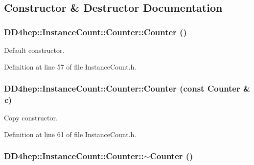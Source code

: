 \subsection{Constructor \& Destructor Documentation}
\hypertarget{class_d_d4hep_1_1_instance_count_1_1_counter_a80741252e730cdf0cb149b77578168a0}{
\subsubsection[{Counter}]{\setlength{\rightskip}{0pt plus 5cm}DD4hep::InstanceCount::Counter::Counter ()}}
\label{class_d_d4hep_1_1_instance_count_1_1_counter_a80741252e730cdf0cb149b77578168a0}


Default constructor. 

Definition at line 57 of file InstanceCount.h.\hypertarget{class_d_d4hep_1_1_instance_count_1_1_counter_aa8a1753db486e2ebee02236dee29ec66}{
\subsubsection[{Counter}]{\setlength{\rightskip}{0pt plus 5cm}DD4hep::InstanceCount::Counter::Counter (const {\bf Counter} \& {\em c})}}
\label{class_d_d4hep_1_1_instance_count_1_1_counter_aa8a1753db486e2ebee02236dee29ec66}


Copy constructor. 

Definition at line 61 of file InstanceCount.h.\hypertarget{class_d_d4hep_1_1_instance_count_1_1_counter_a6bd715538db93a8e4b4f9a27c4b0c793}{
\subsubsection[{$\sim$Counter}]{\setlength{\rightskip}{0pt plus 5cm}DD4hep::InstanceCount::Counter::$\sim$Counter ()}}
\label{class_d_d4hep_1_1_instance_count_1_1_counter_a6bd715538db93a8e4b4f9a27c4b0c793}



